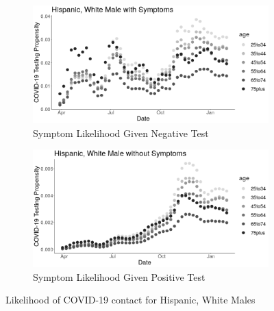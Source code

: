 \documentclass[11pt]{amsart}
\numberwithin{equation}{section}
\theoremstyle{plain}
\begin{document}
\begin{figure}[!th]
\centering
\begin{subfigure}{.5\textwidth}
 \centering
 \includegraphics[width=.9\linewidth]{../figs/tvprop_alt_fig1_supp2.png}
 \caption{Symptom Likelihood Given Negative Test}
\end{subfigure}%
\begin{subfigure}{.5\textwidth}
 \centering
\includegraphics[width=.9\linewidth]{../figs/tvprop_alt_fig2_supp2.png}
 \caption{Symptom Likelihood Given Positive Test}
\end{subfigure}
\caption{Likelihood of COVID-19 contact for Hispanic, White Males}
\label{fig:h-white-male}
\end{figure}
\end{document}

